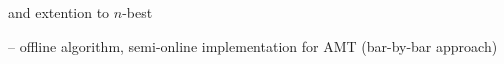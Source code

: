 \documentclass[runningheads]{llncs}
\begin{document}
and extention to $n$-best

\noindent
-- offline algorithm, 
semi-online implementation for AMT (bar-by-bar approach)





%
% 

%






\newpage
\appendix 
\end{document}
